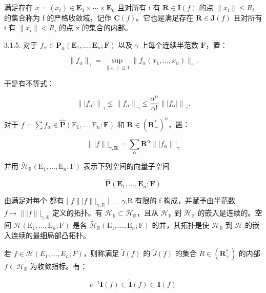 满足存在 \(x = (x_i) \in \mathbf{E}_1 \times \cdots \times \mathbf{E}_n\) 且对所有 i 有 \(\mathbf{R} \in \mathbf{I}(f)\) 的点 \(\|x_i\| \leqslant R_i\) 的集合称为 f 的严格收敛域，记作 \(\mathbf{C}(f)\)。它也是满足存在 \(\mathbf{R} \in \mathbf{J}(f)\) 且对所有 i 有 \(\|x_i\| < R_i\) 的点 x 的集合的内部。

3.1.5. 对于 \(f_{\alpha} \in \mathbf{P}_{\alpha}(\mathbf{E}_1, \ldots, \mathbf{E}_n; \mathbf{F})\) 以及 \(\gamma\) 上每个连续半范数 \(\mathbf{F}\)，置：

\[
\| f _ {\alpha} \| _ {\gamma} = \sup _ {\| x _ {i} \| \leqslant 1} \| f _ {\alpha} (x _ {1}, \dots , x _ {n}) \| _ {\gamma}.
\]

于是有不等式：

\[
\left\| \left| f _ {\alpha} \right| \right\| _ {\gamma} \leqslant \left\| f _ {\alpha} \right\| _ {\gamma} \leqslant \frac {\alpha^ {\alpha}}{\alpha !} \left\| \left| f _ {\alpha} \right| \right\| _ {\gamma}.
\]

对于 \(f = \sum f_{\alpha} \in \hat{\mathbf{P}}(\mathrm{E}_1, \ldots, \mathrm{E}_n; \mathbf{F})\) 和 \(\mathbf{R} \in (\mathbf{R}_{+}^{*})^n\)，置：

\[
\| | f \| | _ {\gamma , \mathbf {R}} = \sum_ {\alpha} \mathbf {R} ^ {\alpha} \| | f _ {\alpha} \| | _ {\gamma}
\]

并用 \(\tilde{\mathcal{H}}_{\mathbb{R}}(\mathrm{E}_{1},\ldots ,\mathrm{E}_{n};\mathrm{F})\) 表示下列空间的向量子空间

\[
\hat {\mathbf {P}} (\mathbf {E} _ {1}, \dots , \mathbf {E} _ {n}; \mathbf {F})
\]

由满足对每个  都有  | \(f\)\(\| | f \| | _ {\gamma,\mathbb{R}}\)  | ＿ \(\gamma\),R 有限的 f 构成，并赋予由半范数 \(f\mapsto\| | f \| | _ {\gamma,\mathbb{R}}\) 定义的拓扑。有 \(\mathcal{H}_{\mathbb{R}}\subset\tilde{\mathcal{H}}_{\mathbb{R}}\)，且从 \(\mathcal{H}_{\mathbb{R}}\) 到 \(\tilde{\mathcal{H}}_{\mathbb{R}}\) 的嵌入是连续的。空间 \(\mathcal{H}(\mathrm{E}_{1},\ldots,\mathrm{E}_{n};\mathrm{F})\) 是各 \(\tilde{\mathcal{H}}_{\mathbb{R}}(\mathrm{E}_{1},\ldots,\mathrm{E}_{n};\mathrm{F})\) 的并，其拓扑是使 \(\mathcal{H}_{\mathbb{R}}\) 到 \(\mathcal{H}\) 的嵌入连续的最细局部凸拓扑。

若 \(f \in \mathcal{H}(E_1, \ldots, E_n; F)\)，则称满足 \(\tilde{I}(f)\) 的 \(\tilde{J}(f)\) 的集合 \(R \in (\mathbf{R}_+^*)\) 的内部 \(f \in \mathcal{H}_{\mathbb{R}}\) 为收敛指标。有：

\[
e ^ {- 1} \mathbf {I} (f) \subset \tilde{\mathbf {I}} (f) \subset \mathbf {I} (f)
\]

